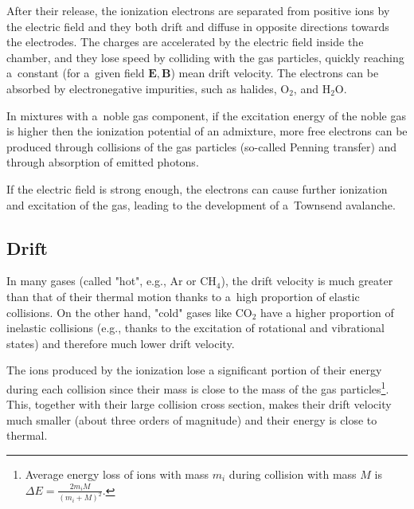 		After their release, the ionization electrons are separated from positive ions by the electric field and they both drift and diffuse in opposite directions towards the electrodes. The charges are accelerated by the electric field inside the chamber, and they lose speed by colliding with the gas particles, quickly reaching a~constant (for a~given field $\mathbf{E}, \mathbf{B}$) mean drift velocity. The electrons can be absorbed by electronegative impurities, such as halides, O$_2$, and H$_2$O.
		
		In mixtures with a~noble gas component, if the excitation energy of the noble gas is higher then the ionization potential of an admixture, more free electrons can be produced through collisions of the gas particles (so\nobreakdash-called Penning transfer) and through absorption of emitted photons.
		
		If the electric field is strong enough, the electrons can cause further ionization and excitation of the gas, leading to the development of a~Townsend avalanche.
	
		\subsection{Drift}			
			In many gases (called "hot", e.g., Ar or CH$_4$), the drift velocity is much greater than that of their thermal motion thanks to a~high proportion of elastic collisions. On the other hand, "cold" gases like CO$_2$ have a higher proportion of inelastic collisions (e.g., thanks to the excitation of rotational and vibrational states) and therefore much lower drift velocity.
			
			The ions produced by the ionization lose a significant portion of their energy during each collision since their mass is close to the mass of the gas particles\footnote{Average energy loss of ions with mass $m_i$ during collision with mass $M$ is $\Delta E = \frac{2m_i M}{(m_i+M)^2}$.}. This, together with their large collision cross section, makes their drift velocity much smaller (about three orders of magnitude) and their energy is close to thermal.
			
